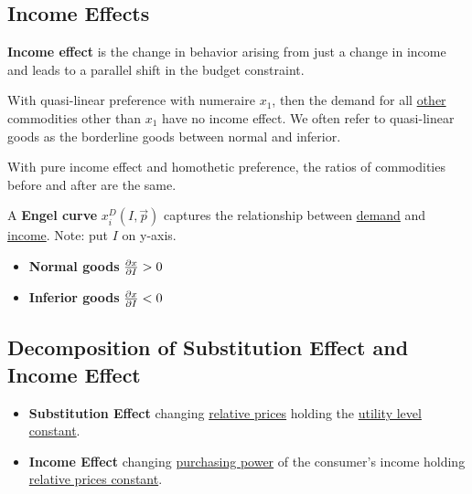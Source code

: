 \documentclass[]{article}
\begin{document}
        \subsection{Income Effects}
            \begin{definition}
                \textbf{Income effect} is the change in behavior arising from just a change in income and leads to a parallel shift in the budget constraint.
            \end{definition}
            
            \begin{remark}
                With quasi-linear preference with numeraire $x_1$, then the demand for all \ul{other} commodities other than $x_1$ have no income effect. We often refer to quasi-linear goods as the borderline goods between normal and inferior.
            \end{remark}
            
            \begin{remark}
                With pure income effect and homothetic preference, the ratios of commodities before and after are the same.
            \end{remark}
            
            \begin{definition}
                A \textbf{Engel curve} $x_i^D(I, \vec{p})$ captures the relationship between \ul{demand} and \ul{income}. Note: put $I$ on y-axis.
            \end{definition}
            
            \begin{itemize}
                \item \textbf{Normal goods} $\frac{\partial{x}}{\partial{I}} > 0$
                \item \textbf{Inferior goods} $\frac{\partial{x}}{\partial{I}} < 0$
            \end{itemize}
            
        \subsection{Decomposition of Substitution Effect and Income Effect}
            \begin{itemize}
                \item \textbf{Substitution Effect} changing \ul{relative prices} holding the \ul{utility level constant}.
                \item \textbf{Income Effect} changing \ul{purchasing power} of the consumer's income holding 
                \ul{relative prices constant}.
            \end{itemize}
            
\end{document}
